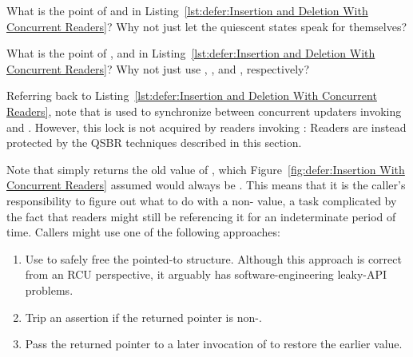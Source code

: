 \QuickQuiz{}
	What is the point of  and  in
	Listing~\ref{lst:defer:Insertion and Deletion With Concurrent Readers}?
	Why not just let the quiescent states speak for themselves?
 \QuickQuizEnd

\QuickQuiz{}
	What is the point of , 
	and  in
	Listing~\ref{lst:defer:Insertion and Deletion With Concurrent Readers}?
	Why not just use , , and
	, respectively?
 \QuickQuizEnd

Referring back to
Listing~\ref{lst:defer:Insertion and Deletion With Concurrent Readers},
note that  is used to synchronize between concurrent updaters
invoking  and .
However, this lock is not acquired by readers invoking :
Readers are instead protected by the QSBR techniques described in this section.

Note that  simply returns the old value of , which
Figure~\ref{fig:defer:Insertion With Concurrent Readers} assumed would
always be .
This means that it is the caller's responsibility to figure out what to
do with a non- value, a task complicated by the fact that
readers might still be referencing it for an indeterminate period of time.
Callers might use one of the following approaches:

\begin{enumerate}
\item	Use  to safely free the pointed-to structure.
	Although this approach is correct from an RCU perspective, it
	arguably has software-engineering leaky-API problems.
\item	Trip an assertion if the returned pointer is non-.
\item	Pass the returned pointer to a later invocation of
	 to restore the earlier value.
\end{enumerate}

